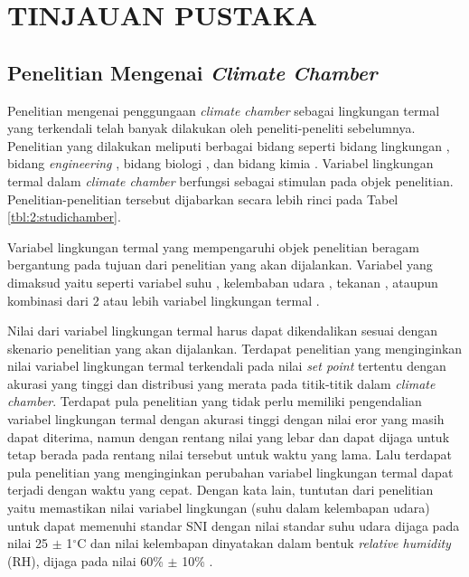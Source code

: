 \chapter{TINJAUAN PUSTAKA}
\label{pustaka}

\section{Penelitian Mengenai \textit{Climate Chamber}}

Penelitian mengenai penggungaan \textit{climate chamber} sebagai lingkungan termal yang terkendali telah banyak dilakukan oleh peneliti-peneliti sebelumnya. Penelitian yang dilakukan meliputi berbagai bidang seperti bidang lingkungan \cite{article4}, bidang \textit{engineering} \cite{article5}, bidang biologi \cite{article6}\cite{article7}, dan bidang kimia \cite{article8}. Variabel lingkungan termal dalam \textit{climate chamber} berfungsi sebagai stimulan pada objek penelitian. Penelitian-penelitian tersebut dijabarkan secara lebih rinci pada Tabel \ref{tbl:2:studichamber}.

Variabel lingkungan termal yang mempengaruhi objek penelitian beragam bergantung pada tujuan dari penelitian yang akan dijalankan. Variabel yang dimaksud yaitu seperti variabel suhu \cite{article5}\cite{article6}\cite{article7}\cite{article8}\cite{article9}, kelembaban udara \cite{article8}, tekanan \cite{article4}, ataupun kombinasi dari 2 atau lebih variabel lingkungan termal \cite{article8}.

Nilai dari variabel lingkungan termal harus dapat dikendalikan sesuai dengan skenario penelitian yang akan dijalankan. Terdapat penelitian yang menginginkan nilai variabel lingkungan termal terkendali pada nilai \textit{set point} tertentu dengan akurasi yang tinggi dan distribusi yang merata pada titik-titik dalam \textit{climate chamber}. Terdapat pula penelitian yang tidak perlu memiliki pengendalian variabel lingkungan termal dengan akurasi tinggi dengan nilai eror yang masih dapat diterima, namun dengan rentang nilai yang lebar dan dapat dijaga untuk tetap berada pada rentang nilai tersebut untuk waktu yang lama. Lalu terdapat pula penelitian yang menginginkan perubahan variabel lingkungan termal dapat terjadi dengan waktu yang cepat. Dengan kata lain, tuntutan dari penelitian yaitu memastikan nilai variabel lingkungan (suhu dalam kelembapan udara) untuk dapat memenuhi standar SNI dengan nilai standar suhu udara dijaga pada nilai 25 $\pm$ 1$^{\circ}$C dan nilai kelembapan dinyatakan dalam bentuk \textit{relative humidity} (RH), dijaga pada nilai 60\% $\pm$ 10\% \cite{SNI-03-06390-2000}.


